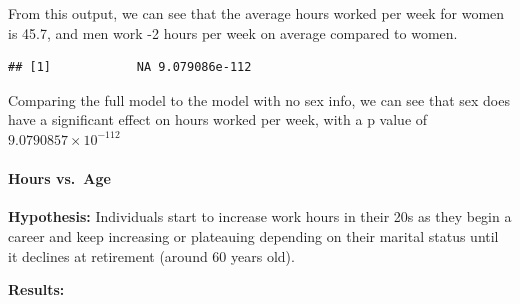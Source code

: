\documentclass[]{article}
\newenvironment{Shaded}{\begin{snugshade}}{\end{snugshade}}
\newcommand{\KeywordTok}[1]{\textcolor[rgb]{0.13,0.29,0.53}{\textbf{#1}}}
\newcommand{\NormalTok}[1]{#1}
\newcommand{\OperatorTok}[1]{\textcolor[rgb]{0.81,0.36,0.00}{\textbf{#1}}}
\let\oldparagraph\paragraph
\renewcommand{\paragraph}[1]{\oldparagraph{#1}\mbox{}}
\begin{document}
From this output, we can see that the average hours worked per week for
women is 45.7, and men work -2 hours per week on average compared to
women.

\begin{Shaded}
\end{Shaded}

\begin{verbatim}
## [1]            NA 9.079086e-112
\end{verbatim}

Comparing the full model to the model with no sex info, we can see that
sex does have a significant effect on hours worked per week, with a p
value of \ensuremath{9.0790857\times 10^{-112}}

\hypertarget{hours-vs.age}{%
\paragraph{Hours vs.~Age}\label{hours-vs.age}}

\textbf{Hypothesis:} Individuals start to increase work hours in their
20s as they begin a career and keep increasing or plateauing depending
on their marital status until it declines at retirement (around 60 years
old).

\textbf{Results:}
\end{document}
